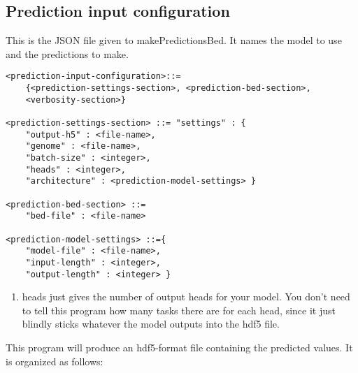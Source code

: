 \documentclass{article}
\begin{document}
\subsection{Prediction input configuration}
This is the JSON file given to makePredictionsBed. It names the model to use and the predictions to make. 

\begin{lstlisting}
<prediction-input-configuration>::=
    {<prediction-settings-section>, <prediction-bed-section>,
    <verbosity-section>}

<prediction-settings-section> ::= "settings" : {
    "output-h5" : <file-name>,
    "genome" : <file-name>,
    "batch-size" : <integer>,
    "heads" : <integer>,
    "architecture" : <prediction-model-settings> }

<prediction-bed-section> ::=
    "bed-file" : <file-name>

<prediction-model-settings> ::={
    "model-file" : <file-name>,
    "input-length" : <integer>,
    "output-length" : <integer> }
\end{lstlisting}
\begin{enumerate}

    \item heads just gives the number of output heads for your model. You don't need to tell this program how many tasks there are for each head, since it just blindly sticks whatever the model outputs into the hdf5 file. 

\end{enumerate}

This program will produce an hdf5-format file containing the predicted values. It is organized as follows:
\end{document}
